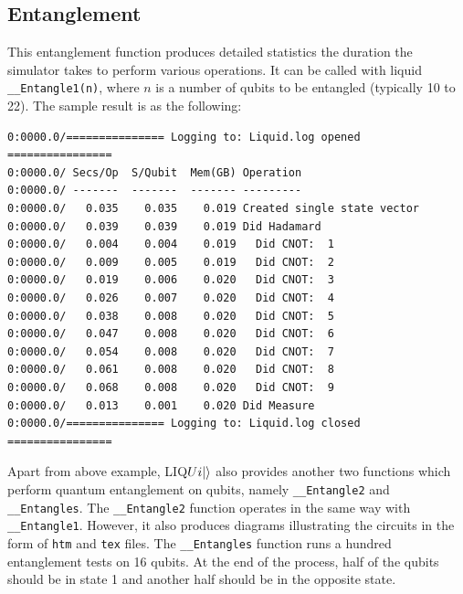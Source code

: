 \documentclass[12pt]{third-rep}
\begin{document}
\subsection{Entanglement}
This entanglement function produces detailed statistics the duration the simulator takes to perform various operations. It can be called with liquid \texttt{\_\_Entangle1(n)}, where $n$ is a number of qubits to be entangled (typically 10 to 22). The sample result is as the following:
\begin{verbatim}
0:0000.0/=============== Logging to: Liquid.log opened ================
0:0000.0/ Secs/Op  S/Qubit  Mem(GB) Operation
0:0000.0/ -------  -------  ------- ---------
0:0000.0/   0.035    0.035    0.019 Created single state vector
0:0000.0/   0.039    0.039    0.019 Did Hadamard
0:0000.0/   0.004    0.004    0.019   Did CNOT:  1
0:0000.0/   0.009    0.005    0.019   Did CNOT:  2
0:0000.0/   0.019    0.006    0.020   Did CNOT:  3
0:0000.0/   0.026    0.007    0.020   Did CNOT:  4
0:0000.0/   0.038    0.008    0.020   Did CNOT:  5
0:0000.0/   0.047    0.008    0.020   Did CNOT:  6
0:0000.0/   0.054    0.008    0.020   Did CNOT:  7
0:0000.0/   0.061    0.008    0.020   Did CNOT:  8
0:0000.0/   0.068    0.008    0.020   Did CNOT:  9
0:0000.0/   0.013    0.001    0.020 Did Measure
0:0000.0/=============== Logging to: Liquid.log closed ================
\end{verbatim}
Apart from above example, LIQ$Ui{\left\vert{}\right\rangle}$ also provides another two functions which perform quantum entanglement on qubits, namely \texttt{\_\_Entangle2} and \texttt{\_\_Entangles}. The \texttt{\_\_Entangle2} function operates in the same way with \texttt{\_\_Entangle1}. However, it also produces diagrams illustrating the circuits in the form of \texttt{htm} and \texttt{tex} files. The \texttt{\_\_Entangles} function runs a hundred entanglement tests on 16 qubits. At the end of the process, half of the qubits should be in state 1 and another half should be in the opposite state.
\end{document}
